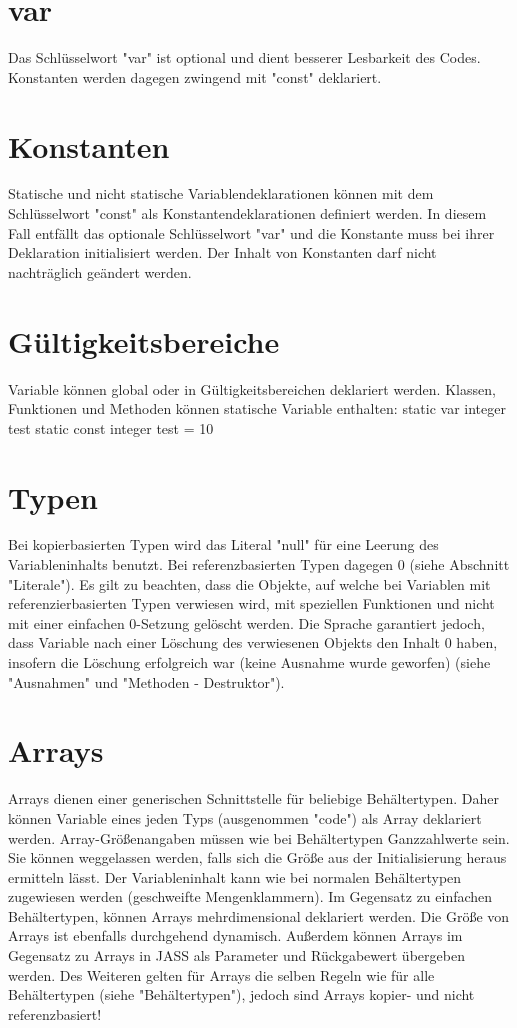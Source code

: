 \section{var}
Das Schlüsselwort "var" ist optional und dient besserer Lesbarkeit des Codes.
Konstanten werden dagegen zwingend mit "const" deklariert.

\section{Konstanten}
Statische und nicht statische Variablendeklarationen können mit dem Schlüsselwort "const" als Konstantendeklarationen definiert
werden.
In diesem Fall entfällt das optionale Schlüsselwort "var" und die Konstante muss bei ihrer Deklaration initialisiert werden.
Der Inhalt von Konstanten darf nicht nachträglich geändert werden.

\section{Gültigkeitsbereiche}
Variable können global oder in Gültigkeitsbereichen deklariert werden.
Klassen, Funktionen und Methoden können statische Variable enthalten:
static var integer test
static const integer test = 10

\section{Typen}
Bei kopierbasierten Typen wird das Literal "null" für eine Leerung des Variableninhalts benutzt. Bei referenzbasierten Typen
dagegen 0 (siehe Abschnitt "Literale").
Es gilt zu beachten, dass die Objekte, auf welche bei Variablen mit referenzierbasierten Typen verwiesen wird, mit speziellen Funktionen
und nicht mit einer einfachen 0-Setzung gelöscht werden.
Die Sprache garantiert jedoch, dass Variable nach einer Löschung des verwiesenen Objekts den Inhalt 0 haben, insofern die Löschung
erfolgreich war (keine Ausnahme wurde geworfen) (siehe "Ausnahmen" und "Methoden - Destruktor").

\section{Arrays}
Arrays dienen einer generischen Schnittstelle für beliebige Behältertypen. Daher können Variable eines jeden Typs (ausgenommen "code")
als Array deklariert werden.
Array-Größenangaben müssen wie bei Behältertypen Ganzzahlwerte sein. Sie können weggelassen werden, falls sich die Größe aus der Initialisierung heraus
ermitteln lässt.
Der Variableninhalt kann wie bei normalen Behältertypen zugewiesen werden (geschweifte Mengenklammern).
Im Gegensatz zu einfachen Behältertypen, können Arrays mehrdimensional deklariert werden.
Die Größe von Arrays ist ebenfalls durchgehend dynamisch. Außerdem können Arrays im Gegensatz zu Arrays in JASS
als Parameter und Rückgabewert übergeben werden.
Des Weiteren gelten für Arrays die selben Regeln wie für alle Behältertypen (siehe "Behältertypen"), jedoch sind Arrays kopier-
und nicht referenzbasiert!

